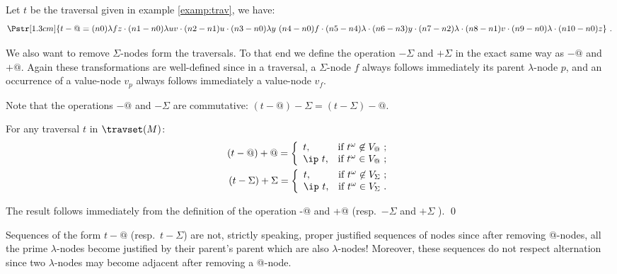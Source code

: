 \begin{example}
Let $t$ be the traversal given in example \ref{examp:trav}, we have:
  $$\Pstr[1.3cm]{ t - @ = (n0){\lambda f z}\cdot (n1-n0){\lambda u v}\cdot (n2-n1){u}\cdot (n3-n0){\lambda y}\ (n4-n0){f}\cdot (n5-n4){\lambda }\cdot (n6-n3){y}\cdot (n7-n2){\lambda }\cdot (n8-n1){v}\cdot (n9-n0){\lambda }\cdot (n10-n0){z}} \ .$$
\end{example}


We also want to remove $\Sigma$-nodes form the traversals. To that end we define the operation $-\Sigma$ and $+\Sigma$ in the exact same way as $-@$ and $+@$. Again these transformations are well-defined since in a traversal, a $\Sigma$-node $f$ always follows immediately its parent $\lambda$-node $p$, and an occurrence of a value-node $v_p$ always follows immediately a value-node $v_f$.

Note that the operations $-@$ and $-\Sigma$ are commutative:
$(t-@)-\Sigma = (t-\Sigma)-@$.

\begin{lemma} \label{lem:minus_at_plus_at}
For any traversal $t$ in $\travset(M)$:
\begin{align*}
(t-@)+@ = \left\{
            \begin{array}{ll}
              t, & \hbox{if $t^\omega \not\in V_@$\ ;} \\
              \ip\ t, & \hbox{if $t^\omega \in V_@$\ ;}
            \end{array}
          \right.
\\
(t-\Sigma)+\Sigma = \left\{
            \begin{array}{ll}
              t, & \hbox{if $t^\omega \not\in V_\Sigma$\ ;} \\
              \ip\ t, & \hbox{if $t^\omega \in V_\Sigma$\ .}
            \end{array}
          \right.
\end{align*}
\end{lemma}
\proof The result follows immediately from the definition of the
operation -@ and +@ (resp.\ $-\Sigma$ and $+\Sigma$ ). \qed

\begin{remark}
Sequences of the form $t-@$ (resp.\ $t-\Sigma$) are not, strictly
speaking, proper justified sequences of nodes since after removing
@-nodes, all the prime $\lambda$-nodes become justified by their
parent's parent which are also $\lambda$-nodes!  Moreover, these
sequences do not respect alternation since two $\lambda$-nodes may
become adjacent after removing a @-node.
\end{remark}
\bigskip

